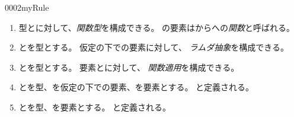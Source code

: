 \documentclass[index]{subfiles}
\begin{document}
\begin{myBlock}{0002}{myRule}
  \begin{enumerate}
  \item 型とに対して、\emph{関数型}を構成できる。
    の要素はからへの\emph{関数}と呼ばれる。
  \item {}とを型とする。
    仮定の下での要素に対して、
    \emph{ラムダ抽象}を構成できる。
  \item {}とを型とする。
    要素とに対して、
    \emph{関数適用}を構成できる。
  \item {}とを型、を仮定の下での要素、を要素とする。
    と定義される。
  \item {}とを型、を要素とする。
    と定義される。
  \end{enumerate}
\end{myBlock}
\end{document}

